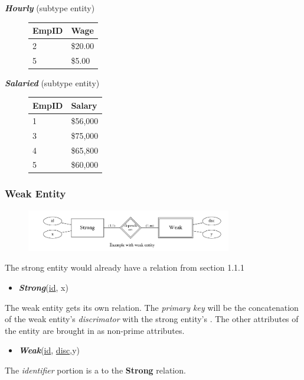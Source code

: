\documentclass{report}
\begin{document}
\noindent    \textit{\textbf{Hourly}} (subtype entity)
    \begin{figure}[H]
    \centering
     \setlength{\tabcolsep}{30}
    \begin{tabular}{ll}
        \toprule
    EmpID & Wage  \\
    \midrule
    2&\$20.00 \\
    5& \$5.00 \\
    \bottomrule
    \end{tabular}
    \end{figure}
    \bigbreak \noindent
    \textit{\textbf{Salaried}} (subtype entity)
        \begin{figure}[H]
        \centering
         \setlength{\tabcolsep}{30}
        \begin{tabular}{ll}
        \toprule 
        EmpID&Salary \\
        \midrule
        1&\$56,000 \\
        3&\$75,000 \\
        4&\$65,800 \\
        5&\$60,000 \\
        \bottomrule
        \end{tabular}
        \end{figure}
        \subsubsection{Weak Entity}
        \begin{figure}[ht]
        \centering
        \includegraphics[width=0.8\textwidth]{ ./figures/04.png }
        \end{figure}
\noindent            The strong entity would already have a relation from section 1.1.1
\begin{itemize}
    \item \textit{\textbf{Strong}}(\underline{id}, x)
\end{itemize}
The weak entity gets its own relation. The \textit{primary key} will be the concatenation of the weak entity's \textit{discrimator} with the strong entity's . The other attributes of the entity are brought in as non-prime attributes.
\begin{itemize}
    \item \textit{\textbf{Weak}}(\underline{id\dag}, \underline{disc},y)
\end{itemize}
The \textit{identifier} portion is a  to the \textbf{Strong} relation.
\end{document}

